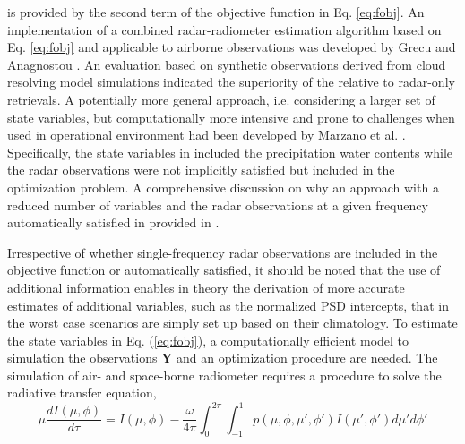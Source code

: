 \documentclass[10pt]{ietbook}
\begin{document}
is provided by the second term of the objective function in Eq. \ref{eq:fobj}. An implementation of a combined radar-radiometer estimation
algorithm based on Eq. \ref{eq:fobj} and applicable to airborne observations was developed by Grecu and Anagnostou \cite{grecu2002}.
An evaluation based on synthetic observations derived from cloud resolving model simulations indicated the superiority of the relative
to radar-only retrievals.  A potentially more general approach, i.e. considering a larger set of state variables, but computationally 
more intensive and prone to challenges when used in operational environment had been developed by Marzano et al. \cite{marzano1999}.
Specifically, the state variables in \cite{marzano1999} included the precipitation water contents while the radar observations were 
not implicitly satisfied but included in the optimization problem.  A comprehensive discussion on why an approach with a reduced number
of variables and the radar observations at a given frequency automatically satisfied in provided in \cite{grecu2002}.

Irrespective of whether single-frequency radar observations are included in the objective function or automatically satisfied, it should
be noted that the use of additional information enables in theory the derivation of more accurate estimates of additional variables, such
as the normalized PSD intercepts, that in the worst case scenarios are simply set up based on their climatology. To estimate the state
variables in Eq. (\ref{eq:fobj}), a computationally efficient model to simulation the observations $\mathbf{Y}$ and an optimization procedure
are needed.  The simulation of air- and space-borne radiometer requires a procedure to solve the radiative transfer equation,
\begin{equation}
\mu\frac {dI(\mu,\phi)}{d\tau}=I(\mu,\phi) - \frac {\omega} {4\pi} \int_0^{2\pi}\int_{-1}^{1}p(\mu,\phi,\mu',\phi')I(\mu',\phi')d\mu'd\phi'
\end{equation}






 
\end{document}
